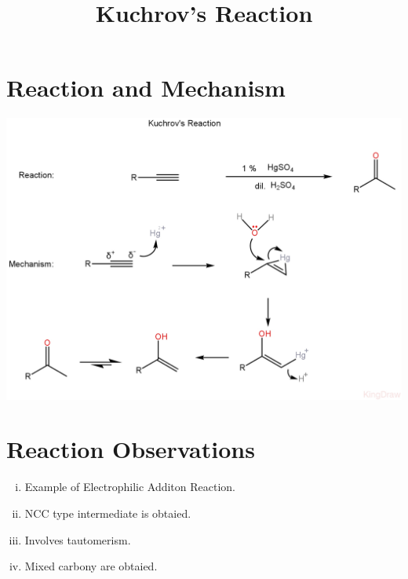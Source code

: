 \documentclass{article}
\title{Kuchrov's Reaction}
\author{}
\date{}
\begin{document}
\maketitle

\section{Reaction and Mechanism}
\includegraphics[scale=0.26]{Kuchrov_1722377904329.JPEG}
\section{Reaction Observations}
\begin{enumerate}[i.]
    \item Example of Electrophilic Additon Reaction.
    \item NCC type intermediate is obtaied.
    \item Involves tautomerism.
    \item Mixed carbony are obtaied.
\end{enumerate}
\end{document}
